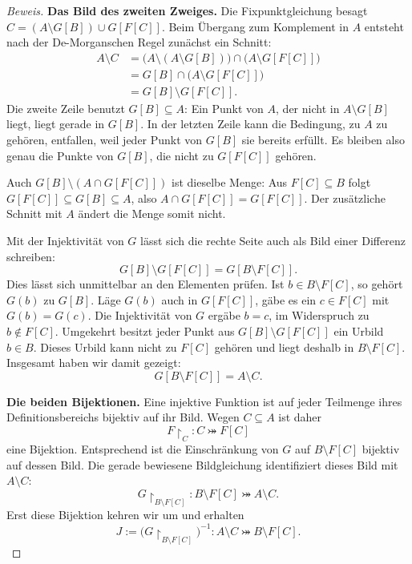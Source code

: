 \begin{proof}[Beweis]
\medskip\noindent
\textbf{Das Bild des zweiten Zweiges.}
Die Fixpunktgleichung besagt
\(C=(A\setminus G[B])\cup G[F[C]]\). Beim Übergang zum
Komplement in \(A\) entsteht nach der De-Morganschen Regel zunächst
ein Schnitt:
\[
  \begin{aligned}
    A\setminus C
      &=\bigl(A\setminus(A\setminus G[B])\bigr)
        \cap\bigl(A\setminus G[F[C]]\bigr)\\
      &=G[B]\cap\bigl(A\setminus G[F[C]]\bigr)\\
      &=G[B]\setminus G[F[C]].
  \end{aligned}
\]
Die zweite Zeile benutzt \(G[B]\subseteq A\): Ein Punkt von \(A\),
der nicht in \(A\setminus G[B]\) liegt, liegt gerade in \(G[B]\).
In der letzten Zeile kann die Bedingung, zu \(A\) zu gehören,
entfallen, weil jeder Punkt von \(G[B]\) sie bereits erfüllt.
Es bleiben also genau die Punkte von \(G[B]\), die nicht zu
\(G[F[C]]\) gehören.

Auch \(G[B]\setminus(A\cap G[F[C]])\) ist dieselbe Menge:
Aus \(F[C]\subseteq B\) folgt
\(G[F[C]]\subseteq G[B]\subseteq A\), also
\(A\cap G[F[C]]=G[F[C]]\). Der zusätzliche Schnitt mit \(A\)
ändert die Menge somit nicht.

Mit der Injektivität von \(G\) lässt sich die rechte Seite auch
als Bild einer Differenz schreiben:
\[
  G[B]\setminus G[F[C]]=G[B\setminus F[C]].
\]
Dies lässt sich unmittelbar an den Elementen prüfen. Ist
\(b\in B\setminus F[C]\), so gehört \(G(b)\) zu \(G[B]\).
Läge \(G(b)\) auch in \(G[F[C]]\), gäbe es ein \(c\in F[C]\)
mit \(G(b)=G(c)\). Die Injektivität von \(G\) ergäbe \(b=c\),
im Widerspruch zu \(b\notin F[C]\). Umgekehrt besitzt jeder Punkt
aus \(G[B]\setminus G[F[C]]\) ein Urbild \(b\in B\).
Dieses Urbild kann nicht zu \(F[C]\) gehören und liegt deshalb in
\(B\setminus F[C]\). Insgesamt haben wir damit gezeigt:
\[
  G[B\setminus F[C]]=A\setminus C.
\]

\medskip\noindent
\textbf{Die beiden Bijektionen.}
Eine injektive Funktion ist auf jeder Teilmenge ihres Definitionsbereichs
bijektiv auf ihr Bild. Wegen \(C\subseteq A\) ist daher
\[
  F\restriction_C\colon C\bij F[C]
\]
eine Bijektion. Entsprechend ist die Einschränkung von \(G\) auf
\(B\setminus F[C]\) bijektiv auf dessen Bild. Die gerade bewiesene
Bildgleichung identifiziert dieses Bild mit \(A\setminus C\):
\[
  G\restriction_{B\setminus F[C]}\colon
  B\setminus F[C]\bij A\setminus C.
\]
Erst diese Bijektion kehren wir um und erhalten
\[
  J:=\bigl(G\restriction_{B\setminus F[C]}\bigr)^{-1}
  \colon A\setminus C\bij B\setminus F[C].
\]


\end{proof}
